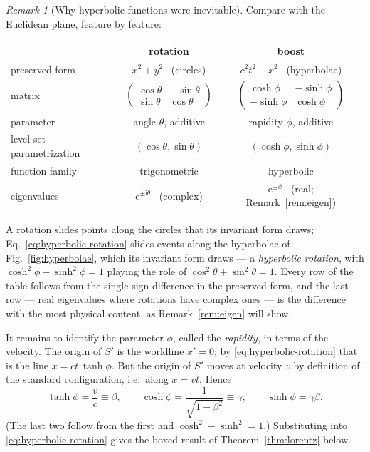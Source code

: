 \documentclass[11pt]{article}
\theoremstyle{plain}
\theoremstyle{definition}
\theoremstyle{remark}
\newtheorem{remark}[theorem]{Remark}
\newcommand{\ee}{\mathrm{e}}
\newcommand{\ii}{\mathrm{i}}
\begin{document}
\begin{remark}[Why hyperbolic functions were inevitable]
\label{rem:hyperbolic-geometry}
Compare with the Euclidean plane, feature by feature:
\begin{center}
\begin{tabular}{lcc}
\toprule
 & rotation & boost \\
\midrule
preserved form & $x^2 + y^2$ \ (circles) & $c^2t^2 - x^2$ \ (hyperbolae) \\[2pt]
matrix &
$\begin{pmatrix} \cos\theta & -\sin\theta \\ \sin\theta & \cos\theta \end{pmatrix}$ &
$\begin{pmatrix} \cosh\phi & -\sinh\phi \\ -\sinh\phi & \cosh\phi \end{pmatrix}$ \\[10pt]
parameter & angle $\theta$, additive & rapidity $\phi$, additive \\[2pt]
level-set parametrization & $(\cos\theta, \sin\theta)$ & $(\cosh\phi, \sinh\phi)$ \\[2pt]
function family & trigonometric & hyperbolic \\[2pt]
eigenvalues & $\ee^{\pm\ii\theta}$ \ (complex) & $\ee^{\pm\phi}$ \ (real; Remark~\ref{rem:eigen}) \\
\bottomrule
\end{tabular}
\end{center}
A rotation slides points along the circles that its invariant form
draws; Eq.~\eqref{eq:hyperbolic-rotation} slides events along the
hyperbolae of Fig.~\ref{fig:hyperbolae}, which its invariant form draws
--- a \emph{hyperbolic rotation}, with
$\cosh^2\phi - \sinh^2\phi = 1$ playing the role of
$\cos^2\theta + \sin^2\theta = 1$. Every row of the table follows from
the single sign difference in the preserved form, and the last row ---
real eigenvalues where rotations have complex ones --- is the difference
with the most physical content, as Remark~\ref{rem:eigen} will show.
\end{remark}

It remains to identify the parameter $\phi$, called the
\emph{rapidity}, in terms of the velocity. The origin of $S'$ is the
worldline $x' = 0$; by \eqref{eq:hyperbolic-rotation} that is the line
$x = ct\,\tanh\phi$. But the origin of $S'$ moves at velocity $v$ by
definition of the standard configuration, i.e.\ along $x = vt$. Hence
\begin{equation}
  \boxed{\;
  \tanh\phi = \frac{v}{c} \equiv \beta,
  \qquad
  \cosh\phi = \frac{1}{\sqrt{1-\beta^2}} \equiv \gamma,
  \qquad
  \sinh\phi = \gamma\beta .
  \;}
  \label{eq:rapidity-def}
\end{equation}
(The last two follow from the first and $\cosh^2 - \sinh^2 = 1$.)
Substituting into \eqref{eq:hyperbolic-rotation} gives the boxed result
of Theorem~\ref{thm:lorentz} below.
\end{document}
